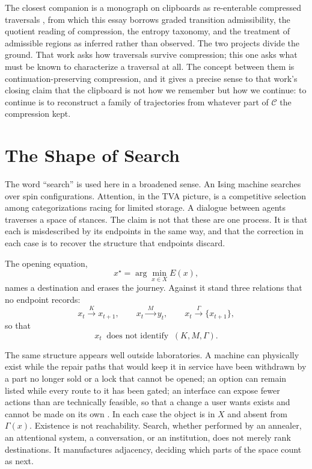 \documentclass[11pt]{article}
\theoremstyle{definition}
\theoremstyle{remark}
\begin{document}
The closest companion is a monograph on clipboards as re-enterable compressed traversals \cite{flyxion-clipboard}, from which this essay borrows graded transition admissibility, the quotient reading of compression, the entropy taxonomy, and the treatment of admissible regions as inferred rather than observed. The two projects divide the ground. That work asks how traversals survive compression; this one asks what must be known to characterize a traversal at all. The concept between them is continuation-preserving compression, and it gives a precise sense to that work's closing claim that the clipboard is not how we remember but how we continue: to continue is to reconstruct a family of trajectories from whatever part of $\mathcal{C}$ the compression kept.

\section{The Shape of Search}

The word ``search'' is used here in a broadened sense. An Ising machine searches over spin configurations. Attention, in the TVA picture, is a competitive selection among categorizations racing for limited storage. A dialogue between agents traverses a space of stances. The claim is not that these are one process. It is that each is misdescribed by its endpoints in the same way, and that the correction in each case is to recover the structure that endpoints discard.

The opening equation,
\begin{equation}
x^\star = \arg\min_{x \in X} E(x),
\end{equation}
names a destination and erases the journey. Against it stand three relations that no endpoint records:
\begin{equation}
x_t \xrightarrow{\;K\;} x_{t+1}, \qquad x_t \xrightarrow{\;M\;} y_t, \qquad x_t \xrightarrow{\;\Gamma\;} \{x_{t+1}\},
\end{equation}
so that
\begin{equation}
x_t \ \text{ does not identify } \ (K, M, \Gamma).
\end{equation}

The same structure appears well outside laboratories. A machine can physically exist while the repair paths that would keep it in service have been withdrawn by a part no longer sold or a lock that cannot be opened; an option can remain listed while every route to it has been gated; an interface can expose fewer actions than are technically feasible, so that a change a user wants exists and cannot be made on its own \cite{flyxion-adjacency}. In each case the object is in $X$ and absent from $\Gamma(x)$. Existence is not reachability. Search, whether performed by an annealer, an attentional system, a conversation, or an institution, does not merely rank destinations. It manufactures adjacency, deciding which parts of the space count as next.
\end{document}
